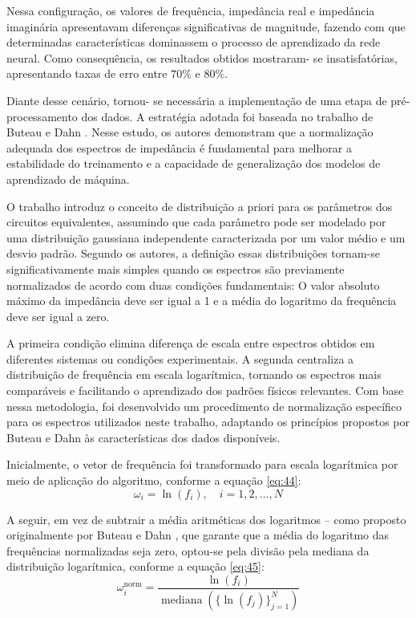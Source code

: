 Nessa configuração, os
valores de frequência, impedância real e impedância imaginária apresentavam diferenças
significativas de magnitude, fazendo com que determinadas características dominassem o
processo de aprendizado da rede neural. Como consequência, os resultados obtidos mostraram-
se insatisfatórias, apresentando taxas de erro entre $70\%$ e $80\%$. 

Diante desse cenário, tornou-
se necessária a implementação de uma etapa de pré-processamento dos dados. A estratégia
adotada foi baseada no trabalho de Buteau e Dahn \cite{buteau2019analysis}. Nesse estudo, os autores demonstram
que a normalização adequada dos espectros de impedância é fundamental para melhorar a
estabilidade do treinamento e a capacidade de generalização dos modelos de aprendizado de
máquina. 

O trabalho introduz o conceito de distribuição a priori para os parâmetros dos circuitos
equivalentes, assumindo que cada parâmetro pode ser modelado por uma distribuição gaussiana
independente caracterizada por um valor médio e um desvio padrão. Segundo os autores, a
definição essas distribuições tornam-se significativamente mais simples quando os espectros
são previamente normalizados de acordo com duas condições fundamentais: O valor absoluto máximo da impedância deve ser igual a 1 e a média do logaritmo da frequência deve ser igual a zero.

A primeira condição elimina diferença de escala entre espectros obtidos em diferentes sistemas
ou condições experimentais. A segunda centraliza a distribuição de frequência em escala
logarítmica, tornando os espectros mais comparáveis e facilitando o aprendizado dos padrões
físicos relevantes. Com base nessa metodologia, foi desenvolvido um procedimento de
normalização específico para os espectros utilizados neste trabalho, adaptando os princípios
propostos por Buteau e Dahn \cite{buteau2019analysis} às características dos dados disponíveis.

Inicialmente, o vetor
de frequência foi transformado para escala logarítmica por meio de aplicação do algoritmo,
conforme a equação \eqref{eq:44}:
\begin{equation}
\omega_i = \ln(f_i), \quad i = 1, 2, \ldots, N
\label{eq:44}
\end{equation}

A seguir, em vez de subtrair a média aritméticas dos logaritmos – como proposto originalmente por Buteau e Dahn \cite{buteau2019analysis}, que garante que a média do logaritmo das frequências normalizadas seja
zero, optou-se pela divisão pela mediana da distribuição logarítmica, conforme a equação \eqref{eq:45}:
\begin{equation}
\omega_i^{\mathrm{norm}} =
\frac{\ln(f_i)}
{\operatorname{mediana}\left(\{\ln(f_j)\}_{j=1}^{N}\right)}
\label{eq:45}
\end{equation}


